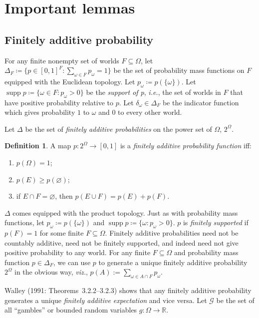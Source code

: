 \documentclass[11pt]{article}
\theoremstyle{definition}
\newtheorem{definition}[theorem]{Definition}
\theoremstyle{remark}
\newcommand{\G}{\mathcal G}
\newcommand{\supp}{\operatorname{supp}}
\begin{document}
\section{Important lemmas}\label{sec:lemmas}

\subsection{Finitely additive probability}\label{sec:prob}

For any finite nonempty set of worlds $F\subseteq\Omega$, let $\Delta_F\coloneqq\{p\in[0,1]^F:\sum_{\omega\in F}p_\omega=1\}$ be the set of probability mass functions on $F$ equipped with the Euclidean topology. Let $p_\omega\coloneqq p(\{\omega\})$. Let $\supp p\coloneqq\{\omega\in F:p_\omega>0\}$ be the \textit{support of p}, \textit{i.e.}, the set of worlds in $F$ that have positive probability relative to $p$. Let $\delta_\omega\in\Delta_F$ be the indicator function which gives probability $1$ to $\omega$ and $0$ to every other world.

Let $\Delta$ be the set of \emph{finitely additive probabilities} on the power set of $\Omega$, $2^\Omega$. 

\begin{definition}\label{def:finitely-additive-probability}
A map $p:2^\Omega\to[0,1]$ is a \emph{finitely additive probability function} iff:
\begin{enumerate}[label=\textup{(FA\arabic*)}]
  \item $p(\Omega)=1$;
  \item $p(E)\geq p(\varnothing)$;
  \item if $E\cap F=\varnothing$, then $p(E\cup F)=p(E)+p(F)$.
\end{enumerate}
\end{definition}

$\Delta$ comes equipped with the product topology. Just as with probability mass functions, let $p_\omega\coloneqq p(\{\omega\})$ and $\supp p\coloneqq\{\omega:p_\omega>0\}$.  $p$ is \emph{finitely supported} if $p(F)=1$ for some finite $F\subseteq\Omega$. Finitely additive probabilities need not be countably additive, need not be finitely supported, and indeed need not give positive probability to any world. For any finite $F\subseteq\Omega$ and probability mass function $p\in\Delta_F$, we can use $p$ to generate a unique finitely additive probability $2^\Omega$ in the obvious way, \textit{viz.}, $p(A):=\sum_{\omega\in A\cap F}p_\omega$.


Walley (1991: Theorems~3.2.2--3.2.3) shows that any finitely additive probability generates a unique \textit{finitely additive expectation} and vice versa. Let $\G$ be the set of all ``gambles'' or bounded random variables $g:\Omega\to\mathbb R$.
\end{document}

